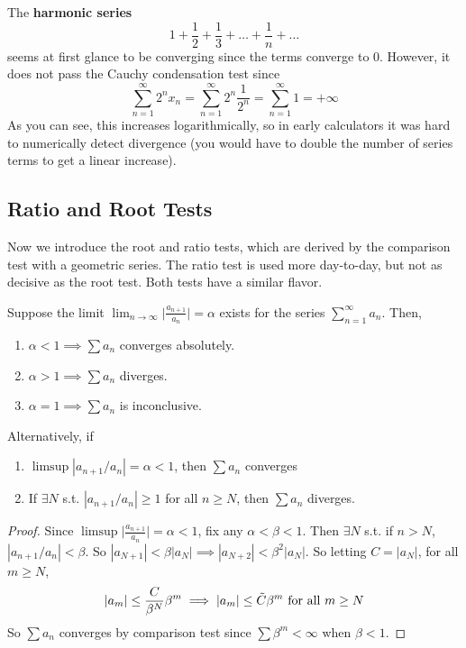   \begin{example}
    The \textbf{harmonic series} 
    \begin{equation}
      1 + \frac{1}{2} + \frac{1}{3} + \ldots + \frac{1}{n} + \ldots
    \end{equation}
    seems at first glance to be converging since the terms converge to $0$. However, it does not pass the Cauchy condensation test since 
    \begin{equation}
      \sum_{n=1}^\infty 2^n x_n = \sum_{n=1}^\infty 2^n \frac{1}{2^n} = \sum_{n=1}^\infty 1 = +\infty
    \end{equation}
    As you can see, this increases logarithmically, so in early calculators it was hard to numerically detect divergence (you would have to double the number of series terms to get a linear increase). 
  \end{example} 

\subsection{Ratio and Root Tests} 

  Now we introduce the root and ratio tests, which are derived by the comparison test with a geometric series. The ratio test is used more day-to-day, but not as decisive as the root test. Both tests have a similar flavor. 

  \begin{theorem}
    Suppose the limit $\lim_{n\rightarrow \infty} \big| \frac{a_{n+1}}{a_n} \big| = \alpha$ exists for the series $\sum_{n=1}^\infty a_n$. Then, 
    \begin{enumerate}
      \item $\alpha < 1 \implies \sum a_n$ converges absolutely. 
      \item $\alpha > 1 \implies \sum a_n$ diverges.
      \item $\alpha = 1 \implies \sum a_n$ is inconclusive. 
    \end{enumerate}
    Alternatively, if 
    \begin{enumerate}
      \item $\limsup |a_{n+1}/a_n| = \alpha < 1$, then $\sum a_n$ converges 
      \item If $\exists N$ s.t. $|a_{n+1}/a_n| \geq 1$ for all $n \geq N$, then $\sum a_n$ diverges. 
    \end{enumerate}
  \end{theorem}
  \begin{proof}
    Since $\limsup \big| \frac{a_{n+1}}{a_n} \big| = \alpha < 1$, fix any $\alpha < \beta < 1$. Then $\exists N$ s.t. if $n > N$, $|a_{n+1}/a_n| < \beta$. So $|a_{N+1}| < \beta |a_N| \implies |a_{N+2}| < \beta^2 |a_N|$. So letting $C = |a_N|$, for all $m \geq N$, 
    \begin{equation}
      |a_m| \leq \frac{C}{\beta^N} \beta^m \implies |a_m| \leq \Tilde{C} \beta^m \text{ for all } m \geq N
    \end{equation}
    So $\sum a_n$ converges by comparison test since $\sum \beta^m < \infty$ when $\beta < 1$. 
  \end{proof}

